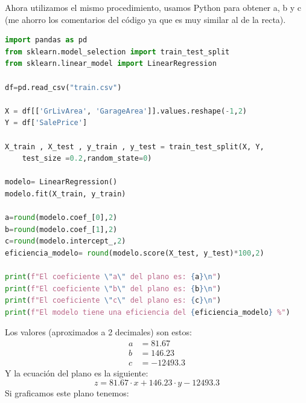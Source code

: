 \documentclass{article}
\begin{document}
\newpage
Ahora utilizamos el mismo procedimiento, usamos Python para obtener a, b y c (me ahorro los comentarios del código ya que es muy similar al de la recta).\\
\begin{lstlisting}[language=Python]
import pandas as pd
from sklearn.model_selection import train_test_split
from sklearn.linear_model import LinearRegression

df=pd.read_csv("train.csv")

X = df[['GrLivArea', 'GarageArea']].values.reshape(-1,2)
Y = df['SalePrice']

X_train , X_test , y_train , y_test = train_test_split(X, Y,
    test_size =0.2,random_state=0)

modelo= LinearRegression()
modelo.fit(X_train, y_train)

a=round(modelo.coef_[0],2)
b=round(modelo.coef_[1],2)
c=round(modelo.intercept_,2)
eficiencia_modelo= round(modelo.score(X_test, y_test)*100,2)

print(f"El coeficiente \"a\" del plano es: {a}\n")
print(f"El coeficiente \"b\" del plano es: {b}\n")
print(f"El coeficiente \"c\" del plano es: {c}\n")
print(f"El modelo tiene una eficiencia del {eficiencia_modelo} %")
\end{lstlisting}
Los valores (aproximados a 2 decimales) son estos:\\
\begin{equation*}
    \begin{split}
        a &=81.67\\
        b &=146.23\\
        c &=-12493.3
    \end{split}
\end{equation*}
Y la ecuación del plano es la siguiente:
\begin{equation*}
    z=81.67\cdot x+146.23\cdot y-12493.3
\end{equation*}
Si graficamos este plano tenemos:\\
\end{document}
